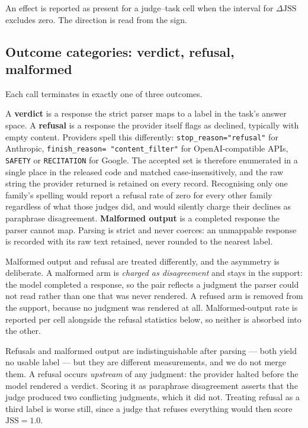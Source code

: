 \documentclass[11pt]{article}          %
\begin{document}
An effect is reported as present for a judge--task cell when the interval for
$\Delta\mathrm{JSS}$ excludes zero. The direction is read from the sign.

\subsection{Outcome categories: verdict, refusal, malformed}
\label{sec:refusal}

Each call terminates in exactly one of three outcomes.

A \textbf{verdict} is a response the strict parser maps to a label in the task's
answer space. A \textbf{refusal} is a response the provider itself flags as
declined, typically with empty content. Providers spell this differently:
\texttt{stop\_reason="refusal"} for Anthropic, \texttt{finish\_reason=
"content\_filter"} for OpenAI-compatible APIs, \texttt{SAFETY} or
\texttt{RECITATION} for Google. The accepted set is therefore enumerated in a
single place in the released code and matched case-insensitively, and the raw string the
provider returned is retained on every record. Recognising only one family's
spelling would report a refusal rate of zero for every other family regardless of
what those judges did, and would silently charge their declines as paraphrase
disagreement.
\textbf{Malformed output} is a completed response the parser cannot map. Parsing
is strict and never coerces: an unmappable response is recorded with its raw text
retained, never rounded to the nearest label.

Malformed output and refusal are treated differently, and the asymmetry is
deliberate. A malformed arm is \emph{charged as disagreement} and stays in the
support: the model completed a response, so the pair reflects a judgment the
parser could not read rather than one that was never rendered. A refused arm is
removed from the support, because no judgment was rendered at all. Malformed-output
rate is reported per cell alongside the refusal statistics below, so neither is
absorbed into the other.

Refusals and malformed output are indistinguishable after parsing --- both yield
no usable label --- but they are different measurements, and we do not merge
them. A refusal occurs \emph{upstream} of any judgment: the provider halted
before the model rendered a verdict. Scoring it as paraphrase disagreement
asserts that the judge produced two conflicting judgments, which it did not.
Treating refusal as a third label is worse still, since a judge that refuses
everything would then score $\mathrm{JSS} = 1.0$.
\end{document}
